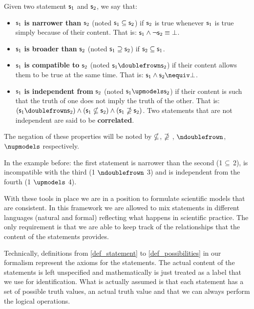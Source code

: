 \documentclass[11pt,letterpaper,fleqn]{memoir} %
\begin{document}
\begin{mathSection}

\begin{defn}
	Given two statement $\mathsf{s}_1$ and $\mathsf{s}_2$, we say that:
	\begin{itemize}
		\item $\mathsf{s}_1$ \textbf{is narrower than} $\mathsf{s}_2$ (noted $\mathsf{s}_1 \subseteq \mathsf{s}_2$) if $\mathsf{s}_2$ is true whenever $\mathsf{s}_1$ is true simply because of their content. That is: $\mathsf{s}_1 \wedge \neg \mathsf{s}_2 \equiv \bot$.
		\item $\mathsf{s}_1$ \textbf{is broader than} $\mathsf{s}_2$ (noted $\mathsf{s}_1 \supseteq \mathsf{s}_2$) if $\mathsf{s}_2 \subseteq \mathsf{s}_1$.
		\item $\mathsf{s}_1$ \textbf{is compatible to} $\mathsf{s}_2$ (noted $\stmt{s}_1 \comp \stmt{s}_2$) if their content allows them to be true at the same time. That is: $\stmt{s}_1 \AND \stmt{s}_2 \nequiv \contradiction$.
		\item $\mathsf{s}_1$ \textbf{is independent from} $\mathsf{s}_2$ (noted $\stmt{s}_1 \indep \stmt{s}_2$) if their content is such that the truth of one does not imply the truth of the other. That is: $(\stmt{s}_1 \comp \stmt{s}_2) \AND (\stmt{s}_1 \nnarrower \stmt{s}_2) \AND (\stmt{s}_1 \nbroader \stmt{s}_2)$. Two statements that are not independent are said to be \textbf{correlated}.
	\end{itemize}
	The negation of these properties will be noted by $\nsubseteq$, $\nsupseteq$ , $\ncomp$, $\nindep$ respectively.
\end{defn}

\end{mathSection}

In the example before: the first statement is narrower than the second (1 $\subseteq$ 2), is incompatible with the third (1 $\ncomp$ 3) and is independent from the fourth (1 $\indep$ 4).

With these tools in place we are in a position to formulate scientific models that are consistent. In this framework we are allowed to mix statements in different languages (natural and formal) reflecting what happens in scientific practice. The only requirement is that we are able to keep track of the relationships that the content of the statements provides.

Technically, definitions from \ref{def_statement} to \ref{def_possibilities} in our formalism represent the axioms for the statements. The actual content of the statements is left unspecified and mathematically is just treated as a label that we use for identification. What is actually assumed is that each statement has a set of possible truth values, an actual truth value and that we can always perform the logical operations.
\end{document}
